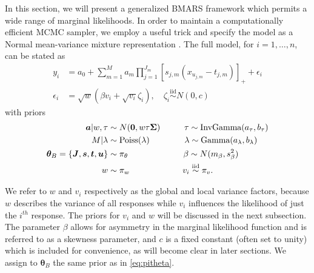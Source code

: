 \documentclass{article} %
\begin{document}
In this section, we will present a generalized BMARS framework which permits a wide range of marginal likelihoods. In order to maintain a computationally efficient MCMC sampler, we employ a useful trick and specify the model as a Normal mean-variance mixture representation \citep{barndorff1982normal}. The full model, for $i=1,\ldots, n$, can be stated as
\begin{equation}
\label{eq:gbmars_error}
\begin{aligned}
    y_i &= a_0 + \sum_{m=1}^Ma_m\prod_{j=1}^{J_m}[s_{j,m}(x_{u_{j,m}} - t_{j,m})]_+ + \epsilon_i \\ 
    \epsilon_i &= \sqrt{w}\left(\beta v_i  + \sqrt{v_i} \zeta_i\right), \quad \zeta_i \stackrel{\text{iid}}{\sim} N(0, c) 
\end{aligned}  
\end{equation}
with priors
\begin{equation}
\label{eq:gbmars_priors}
\begin{aligned}
    \bm a | w, \tau &\sim N(\bm 0, w\tau\bm\Sigma) \hspace{1cm}
    \tau \sim \text{InvGamma}(a_\tau, b_\tau) \\
    M|\lambda &\sim \text{Poiss}(\lambda) \hspace{1.45cm}
    \lambda \sim \text{Gamma}(a_\lambda, b_\lambda) \\
    \bm\theta_B = \{ \bm J, \bm s, \bm t, \bm u\} &\sim \pi_\theta \hspace{2.3cm}
    \beta \sim N(m_\beta, s_\beta^2) \\
    w &\sim \pi_w  \hspace{2.2cm}
    v_i \stackrel{\text{iid}}{\sim} \pi_v.
\end{aligned}  
\end{equation}

We refer to $w$ and $v_i$ respectively as the global and local variance factors, because $w$ describes the variance of all responses while $v_i$ influences the likelihood of just the $i^{th}$ response. The priors for $v_i$ and $w$ will be discussed in the next subsection. The parameter $\beta$ allows for asymmetry in the marginal likelihood function and is referred to as a skewness parameter, and $c$ is a fixed constant (often set to unity) which is included for convenience, as will become clear in later sections. We assign to $\bm\theta_B$ the same prior as in \cref{eq:pitheta}.
\end{document}
